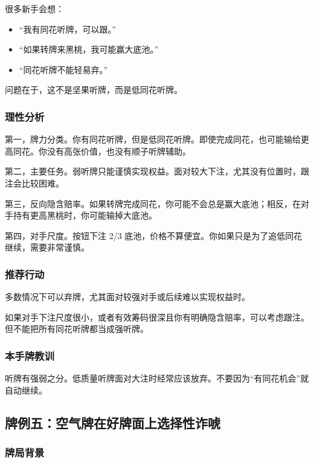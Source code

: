 很多新手会想：

\begin{itemize}
\item “我有同花听牌，可以跟。”
\item “如果转牌来黑桃，我可能赢大底池。”
\item “同花听牌不能轻易弃。”
\end{itemize}

问题在于，这不是坚果听牌，而是低同花听牌。

\subsubsection*{理性分析}

第一，牌力分类。你有同花听牌，但是低同花听牌。即使完成同花，也可能输给更高同花。你没有高张价值，也没有顺子听牌辅助。

第二，主要任务。弱听牌只能谨慎实现权益。面对较大下注，尤其没有位置时，跟注会比较困难。

第三，反向隐含赔率。如果转牌完成同花，你可能不会总是赢大底池；相反，在对手持有更高黑桃时，你可能输掉大底池。

第四，对手尺度。按钮下注 2/3 底池，价格不算便宜。你如果只是为了追低同花继续，需要非常谨慎。

\subsubsection*{推荐行动}

多数情况下可以弃牌，尤其面对较强对手或后续难以实现权益时。

如果对手下注尺度很小，或者有效筹码很深且你有明确隐含赔率，可以考虑跟注。但不能把所有同花听牌都当成强听牌。

\subsubsection*{本手牌教训}

听牌有强弱之分。低质量听牌面对大注时经常应该放弃。不要因为“有同花机会”就自动继续。

\subsection{牌例五：空气牌在好牌面上选择性诈唬}

\subsubsection*{牌局背景}

